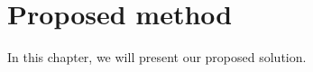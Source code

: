 \chapter{Proposed method}

\label{kap:proposedMethod} %

In this chapter, we will present our proposed solution.
